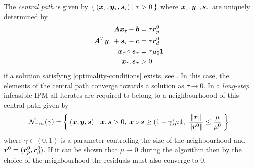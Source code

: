 The \emph{central path} is given by \(\Set{(\bm{x}_\tau, \bm{y}_\tau, \bm{s}_\tau) | \tau > 0}\) where \(\bm{x}_\tau, \bm{y}_\tau, \bm{s}_\tau\) are uniquely determined by
\begin{subequations}
  \begin{align}
    \bm{A}\bm{x}_\tau - \bm{b} &= \tau \bm{r}_p^0 \\
    \bm{A}^T \bm{y}_\tau + \bm{s}_\tau - \bm{c} &= \tau \bm{r}_d^0 \\
    \bm{x}_\tau \circ \bm{s}_\tau &= \tau \mu_0 \bm{1} \\
    \bm{x}_\tau, \bm{s}_\tau &> 0
  \end{align}
\end{subequations}
if a solution satisfying \cref{optimality-conditions} exists, see \cite{Mizuno-PolynomialTimeConvergenceInexactIPM}.
In this case, the elements of the central path converge towards a solution as \(\tau \to 0\).
In a \emph{long-step} infeasible IPM all iterates are required to belong to a neighbourhoood of this central path given by
\begin{equation}
  \mathcal{N}_{-\infty}(\gamma) = \Set{ (\bm{x}, \bm{y}, \bm{s}) | \bm{x}, \bm{s} > 0, \ \bm{x} \circ \bm{s} \geq (1 - \gamma) \mu \bm{1}, \ \frac{\lVert \bm{r} \rVert}{\lVert \bm{r}^0 \rVert} \leq \frac{\mu}{\mu^0} }
\end{equation}
where \(\gamma \in (0, 1)\) is a parameter controlling the size of the neighbourhood and \(\bm{r}^0 = (\bm{r}_p^0, \bm{r}_d^0)\).
If it can be shown that \(\mu \to 0\) during the algorithm then by the choice of the neighbourhood the residuals must also converge to \(0\).

